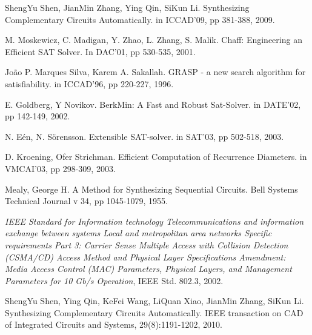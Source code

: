 \documentclass[journal]{IEEEtran}
\begin{document}
%
%
%
\begin{thebibliography}{1}

ShengYu Shen, JianMin Zhang, Ying Qin, SiKun Li.
Synthesizing Complementary Circuits Automatically.
in ICCAD'09,
pp 381-388,
2009.

M. Moskewicz, C. Madigan, Y. Zhao, L. Zhang, S. Malik.
Chaff: Engineering an Efficient SAT Solver.
In DAC'01,
pp 530-535,
2001.

Jo\~ao P. Marques Silva, Karem A. Sakallah.
GRASP - a new search algorithm for satisfiability.
in ICCAD'96,
pp 220-227,
1996.

E. Goldberg, Y Novikov.
BerkMin: A Fast and Robust Sat-Solver.
\newpage
in DATE'02,
pp 142-149,
2002.

N. E\'en, N. S\"orensson.
Extensible SAT-solver.
in SAT'03,
pp 502-518,
2003.

D. Kroening, Ofer Strichman.
Efficient Computation of Recurrence Diameters.
in VMCAI'03,
pp 298-309,
2003.

Mealy, George H.
A Method for Synthesizing Sequential Circuits.
Bell Systems Technical Journal v 34, pp 1045-1079, 1955.

\emph{IEEE Standard for Information technology Telecommunications and
  information exchange between systems Local and metropolitan area networks
  Specific requirements Part 3: Carrier Sense Multiple Access with Collision
  Detection (CSMA/CD) Access Method and Physical Layer Specifications
  Amendment: Media Access Control (MAC) Parameters, Physical Layers, and
  Management Parameters for 10 Gb/s Operation}, IEEE Std. 802.3, 2002.

ShengYu Shen, Ying Qin, KeFei Wang, LiQuan Xiao, JianMin Zhang, SiKun Li.
Synthesizing Complementary Circuits Automatically.
IEEE transaction on CAD of Integrated Circuits and Systems,
29(8):1191-1202,
2010.


\end{thebibliography}
\end{document}
